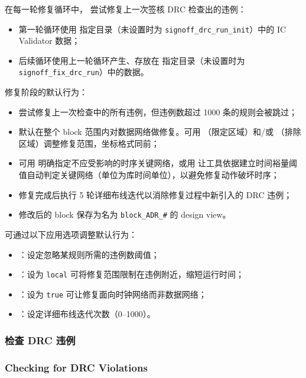 在每一轮修复循环中， 尝试修复上一次签核 DRC 检查出的违例：
\begin{itemize}
  \item 第一轮循环使用  指定目录（未设置时为 \texttt{signoff\_drc\_run\_init}）中的 IC Validator 数据；
  \item 后续循环使用上一轮循环产生、存放在  指定目录（未设置时为 \texttt{signoff\_fix\_drc\_run}）中的数据。
\end{itemize}

修复阶段的默认行为：
\begin{itemize}
  \item 尝试修复上一次检查中的所有违例，但违例数超过 1000 条的规则会被跳过；
  \item 默认在整个 block 范围内对数据网络做修复。可用 （限定区域）和/或 （排除区域）调整修复范围，坐标格式同前；
  \item 可用  明确指定不应受影响的时序关键网络，或用  让工具依据建立时间裕量阈值自动判定关键网络（单位为库时间单位），以避免修复动作破坏时序；
  \item 修复完成后执行 5 轮详细布线迭代以消除修复过程中新引入的 DRC 违例；
  \item 修改后的 block 保存为名为 \texttt{block\_ADR\_\#} 的 design view。
\end{itemize}

可通过以下应用选项调整默认行为：
\begin{itemize}
  \item {}：设定忽略某规则所需的违例数阈值；
  \item {}：设为 \texttt{local} 可将修复范围限制在违例附近，缩短运行时间；
  \item {}：设为 \texttt{true} 可让修复面向时钟网络而非数据网络；
  \item {}：设定详细布线迭代次数（0--1000）。
\end{itemize}

\subsubsection{检查 DRC 违例}
\subsubsection*{Checking for DRC Violations}

